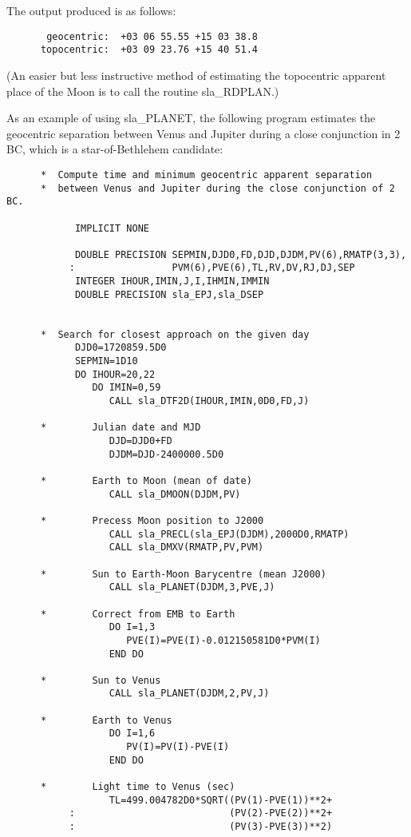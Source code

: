 \documentclass[11pt,twoside]{article}
\begin{document}
\goodbreak
The output produced is as follows:
\goodbreak
\begin{verbatim}
       geocentric:  +03 06 55.55 +15 03 38.8
      topocentric:  +03 09 23.76 +15 40 51.4
\end{verbatim}
\goodbreak
(An easier but
less instructive method of estimating the topocentric apparent place of the
Moon is to call the routine
sla\_RDPLAN.)

As an example of using
sla\_PLANET,
the following program estimates the geocentric separation
between Venus and Jupiter during a close conjunction
in 2\,BC, which is a star-of-Bethlehem candidate:
\goodbreak
\begin{verbatim}
      *  Compute time and minimum geocentric apparent separation
      *  between Venus and Jupiter during the close conjunction of 2 BC.

            IMPLICIT NONE

            DOUBLE PRECISION SEPMIN,DJD0,FD,DJD,DJDM,PV(6),RMATP(3,3),
           :                 PVM(6),PVE(6),TL,RV,DV,RJ,DJ,SEP
            INTEGER IHOUR,IMIN,J,I,IHMIN,IMMIN
            DOUBLE PRECISION sla_EPJ,sla_DSEP


      *  Search for closest approach on the given day
            DJD0=1720859.5D0
            SEPMIN=1D10
            DO IHOUR=20,22
               DO IMIN=0,59
                  CALL sla_DTF2D(IHOUR,IMIN,0D0,FD,J)

      *        Julian date and MJD
                  DJD=DJD0+FD
                  DJDM=DJD-2400000.5D0

      *        Earth to Moon (mean of date)
                  CALL sla_DMOON(DJDM,PV)

      *        Precess Moon position to J2000
                  CALL sla_PRECL(sla_EPJ(DJDM),2000D0,RMATP)
                  CALL sla_DMXV(RMATP,PV,PVM)

      *        Sun to Earth-Moon Barycentre (mean J2000)
                  CALL sla_PLANET(DJDM,3,PVE,J)

      *        Correct from EMB to Earth
                  DO I=1,3
                     PVE(I)=PVE(I)-0.012150581D0*PVM(I)
                  END DO

      *        Sun to Venus
                  CALL sla_PLANET(DJDM,2,PV,J)

      *        Earth to Venus
                  DO I=1,6
                     PV(I)=PV(I)-PVE(I)
                  END DO

      *        Light time to Venus (sec)
                  TL=499.004782D0*SQRT((PV(1)-PVE(1))**2+
           :                           (PV(2)-PVE(2))**2+
           :                           (PV(3)-PVE(3))**2)


\end{verbatim}
\end{document}
